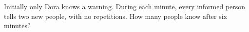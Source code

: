Initially only Dora knows a warning. During each minute, every informed person tells two new people, with no repetitions. How many people know after six minutes?
